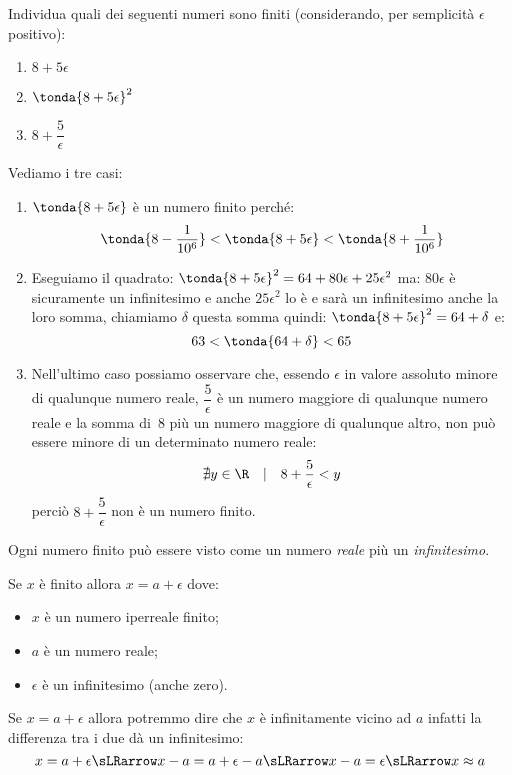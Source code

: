 \begin{esempio}
 Individua quali dei seguenti numeri sono finiti (considerando, per 
semplicità \(\epsilon\) positivo):

\begin{multicols}{3}
\begin{enumerate}
 \item \(8+5\epsilon\)
 \item \(\tonda{8+5\epsilon}^2\)
 \item \(8+\dfrac{5}{\epsilon}\)
\end{enumerate}
\end{multicols}

Vediamo i tre casi:

\begin{enumerate}
 \item \(\tonda{8+5\epsilon}\) è un numero finito perché:
 \[\tonda{8-\dfrac{1}{10^6}} < \tonda{8+5\epsilon} < 
   \tonda{8+\dfrac{1}{10^6}}\]
 \item Eseguiamo il quadrato:
 \(\tonda{8+5\epsilon}^2 = 64 +80 \epsilon +25 \epsilon^2\)
 ma: \(80 \epsilon\) è sicuramente un infinitesimo e anche \(25 \epsilon^2\)
 lo è e sarà un infinitesimo anche la loro somma, chiamiamo \(\delta\) 
questa somma quindi: 
\(\tonda{8+5\epsilon}^2 = 64 + \delta\)
e: 
\[63 < \tonda{64 + \delta} < 65\]
 \item Nell'ultimo caso possiamo osservare che, essendo \(\epsilon\) in 
valore assoluto minore di qualunque numero reale, 
 \(\dfrac{5}{\epsilon}\) è un numero maggiore di qualunque numero reale e 
la somma di~8 più un numero maggiore di qualunque altro, non può essere 
minore di un determinato numero reale:
 \[\nexists y \in \R \quad | \quad 8+\dfrac{5}{\epsilon} < y\]
perciò \(8+\dfrac{5}{\epsilon}\) non è un numero finito.
\end{enumerate}
\end{esempio}

\noindent Ogni numero finito può essere visto come un numero \emph{reale} 
più un \emph{infinitesimo}.

Se \(x\) è finito allora \(x = a + \epsilon\) dove:
\begin{itemize} [noitemsep]
 \item \(x\) è un numero iperreale finito;
 \item \(a\) è un numero reale;
 \item \(\epsilon\) è un infinitesimo (anche zero).
\end{itemize}

Se \(x=a+\epsilon\) allora potremmo dire che \(x\) è infinitamente vicino 
ad \(a\) infatti la differenza tra i due dà un infinitesimo: 
\[x=a+\epsilon \sLRarrow
x-a = a+\epsilon-a \sLRarrow x-a = \epsilon \sLRarrow x \approx a\] 


